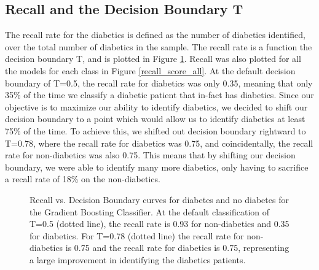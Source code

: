 \documentclass{article} %
\begin{document}
\subsection{Recall and the Decision Boundary T}
The recall rate for the diabetics is defined as the number of diabetics identified, over the total number of diabetics in the sample. The recall rate is a function the decision boundary T, and is plotted in Figure \ref{recall_decision}. Recall was also plotted for all the models for each class in Figure \ref{recall_score_all}. At the default decision boundary of T=0.5, the recall rate for diabetics was only 0.35, meaning that only 35\% of the time we classify a diabetic patient that in-fact has diabetics. Since our objective is to maximize our ability to identify diabetics, we decided to shift our decision boundary to a point which would allow us to identify diabetics at least 75\% of the time. To achieve this, we shifted out decision boundary rightward to T=0.78, where the recall rate for diabetics was 0.75, and coincidentally, the recall rate for non-diabetics was also 0.75. This means that by shifting our decision boundary, we were able to identify many more diabetics, only having to sacrifice a recall rate of 18\% on the non-diabetics. 

\begin{figure}[h]
\begin{center}
\end{center}
\caption{Recall vs. Decision Boundary curves for diabetes and no diabetes for the Gradient Boosting Classifier. At the default classification of T=0.5 (dotted line), the recall rate is 0.93 for non-diabetics and 0.35 for diabetics. For T=0.78 (dotted line) the recall rate for non-diabetics is 0.75 and the recall rate for diabetics is 0.75, representing a large improvement in identifying the diabetics patients.}
\label{recall_decision}
\end{figure}
\end{document}
